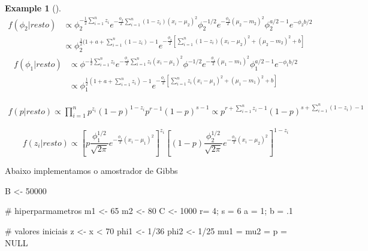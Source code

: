 \documentclass[
  letterpaper,
  DIV=11,
  numbers=noendperiod]{scrreprt}
\newenvironment{Shaded}{\begin{snugshade}}{\end{snugshade}}
\newcommand{\CommentTok}[1]{\textcolor[rgb]{0.37,0.37,0.37}{#1}}
\newcommand{\ConstantTok}[1]{\textcolor[rgb]{0.56,0.35,0.01}{#1}}
\newcommand{\DecValTok}[1]{\textcolor[rgb]{0.68,0.00,0.00}{#1}}
\newcommand{\NormalTok}[1]{\textcolor[rgb]{0.00,0.23,0.31}{#1}}
\newcommand{\OtherTok}[1]{\textcolor[rgb]{0.00,0.23,0.31}{#1}}
\newcommand{\SpecialCharTok}[1]{\textcolor[rgb]{0.37,0.37,0.37}{#1}}
\theoremstyle{definition}
\theoremstyle{plain}
\theoremstyle{definition}
\newtheorem{example}{Example}[chapter]
\theoremstyle{remark}
\begin{document}
\begin{example}[]
\[\begin{align}f(\phi_2|resto)&\propto \phi_2^{-\frac{1}{2}\sum_{i=1}^{n}z_i}
e^{-\frac{\phi_2}{2}\sum_{i=1}^n (1-z_i)(x_i-\mu_2)^2}\phi^{-1/2}_2e^{-\frac{\phi_2}{2}(\mu_2-m_2)^2}\phi_2^{a/2-1}e^{-\phi_2 b/2}\\ &\propto \phi_2^{\frac{1}{2}(1+a+\sum_{i=1}^{n}(1-z_i)-1}e^{-\frac{\phi_2}{2}[\sum_{i=1}^n(1-z_i)(x_i-\mu_2)^2 +(\mu_2-m_2)^2 + b]}\end{align}\]
\[\begin{align}f(\phi_1|resto)&\propto \phi^{-\frac{1}{2}\sum_{i=1}^{n}z_i}
e^{-\frac{\phi_1}{2}\sum_{i=1}^n z_i(x_i-\mu_1)^2}\phi^{-1/2}e^{-\frac{\phi_1}{2}(\mu_1-m_1)^2}\phi_1^{a/2-1}e^{-\phi_1 b/2}\\ &\propto \phi_1^{\frac{1}{2}(1+a+\sum_{i=1}^{n}z_i)-1}e^{-\frac{\phi_1}{2}[\sum_{i=1}^nz_i(x_i-\mu_1)^2 +(\mu_1-m_1)^2 + b]}\end{align}\]

\[\begin{align}f(p|resto)\propto \prod_{i=1}^n p^{z_i}(1-p)^{1-z_i}p^{r-1}(1-p)^{s-1}\propto p^{r+\sum_{i=1}^n z_i-1}(1-p)^{s+\sum_{i=1}^n (1-z_i)-1}\end{align}\]

\[f(z_i|resto)\propto\left[ p\frac{\phi_1^{1/2}}{\sqrt{2\pi}}e^{-\frac{\phi_1}{2}(x_i-\mu_1)^2}\right]^{z_i}\left[ (1-p)\frac{\phi_2^{1/2}}{\sqrt{2\pi}}e^{-\frac{\phi_2}{2}(x_i-\mu_2)^2}\right]^{1-z_i}\]

Abaixo implementamos o amostrador de Gibbs

\begin{Shaded}
\begin{Highlighting}[]
\NormalTok{B }\OtherTok{\textless{}{-}} \DecValTok{50000}

\CommentTok{\# hiperparmametros}
\NormalTok{m1 }\OtherTok{\textless{}{-}} \DecValTok{65}
\NormalTok{m2 }\OtherTok{\textless{}{-}} \DecValTok{80}
\NormalTok{C }\OtherTok{\textless{}{-}} \DecValTok{1000}
\NormalTok{r}\OtherTok{=} \DecValTok{4}\NormalTok{; s }\OtherTok{=} \DecValTok{6}
\NormalTok{a }\OtherTok{=} \DecValTok{1}\NormalTok{; b }\OtherTok{=}\NormalTok{ .}\DecValTok{1}

\CommentTok{\# valores iniciais}
\NormalTok{z }\OtherTok{\textless{}{-}}\NormalTok{ x }\SpecialCharTok{\textless{}} \DecValTok{70}
\NormalTok{phi1 }\OtherTok{\textless{}{-}} \DecValTok{1}\SpecialCharTok{/}\DecValTok{36}
\NormalTok{phi2 }\OtherTok{\textless{}{-}} \DecValTok{1}\SpecialCharTok{/}\DecValTok{25}
\NormalTok{mu1 }\OtherTok{=}\NormalTok{ mu2 }\OtherTok{=}\NormalTok{  p }\OtherTok{=} \ConstantTok{NULL}


\end{Highlighting}
\end{Shaded}
\end{example}
\end{document}
